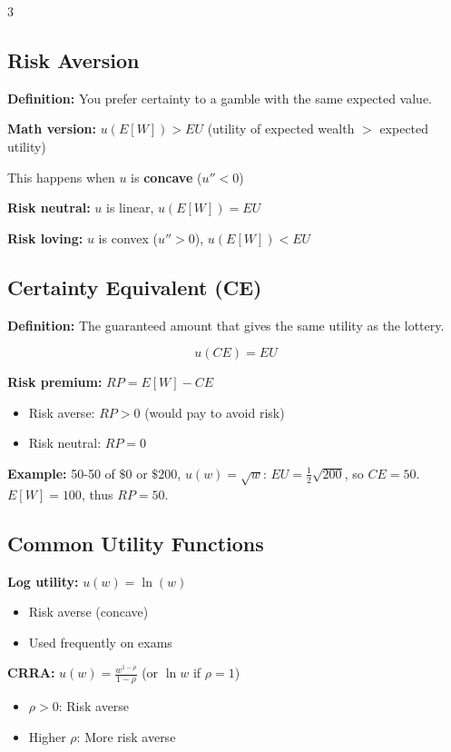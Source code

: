\documentclass[10pt,landscape]{article}
\begin{document}
\begin{multicols}{3}
\subsection{Risk Aversion}
\textbf{Definition:} You prefer certainty to a gamble with the same expected value.

\textbf{Math version:} $u(E[W]) > EU$ (utility of expected wealth $>$ expected utility)

This happens when $u$ is \textbf{concave} ($u'' < 0$)

\textbf{Risk neutral:} $u$ is linear, $u(E[W]) = EU$

\textbf{Risk loving:} $u$ is convex ($u'' > 0$), $u(E[W]) < EU$

\subsection{Certainty Equivalent (CE)}
\textbf{Definition:} The guaranteed amount that gives the same utility as the lottery.

$$u(CE) = EU$$

\textbf{Risk premium:} $RP = E[W] - CE$
\begin{itemize}[leftmargin=*,noitemsep,topsep=0pt]
\item Risk averse: $RP > 0$ (would pay to avoid risk)
\item Risk neutral: $RP = 0$
\end{itemize}

\textbf{Example:} 50-50 of $\$0$ or $\$200$, $u(w) = \sqrt{w}$: $EU = \frac{1}{2}\sqrt{200}$, so $CE = 50$. $E[W] = 100$, thus $RP = 50$.

\subsection{Common Utility Functions}
\textbf{Log utility:} $u(w) = \ln(w)$
\begin{itemize}[leftmargin=*,noitemsep,topsep=0pt]
\item Risk averse (concave)
\item Used frequently on exams
\end{itemize}

\textbf{CRRA:} $u(w) = \frac{w^{1-\rho}}{1-\rho}$ (or $\ln w$ if $\rho=1$)
\begin{itemize}[leftmargin=*,noitemsep,topsep=0pt]
\item $\rho > 0$: Risk averse
\item Higher $\rho$: More risk averse
\end{itemize}


\end{multicols}
\end{document}
